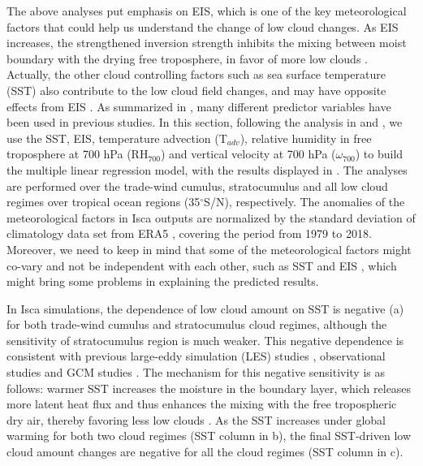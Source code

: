 The above analyses put emphasis on EIS, which is one of the key meteorological factors that could help us understand the change of low cloud changes. As EIS increases, the strengthened inversion strength inhibits the mixing between moist boundary with the drying free troposphere, in favor of more low clouds \citep[e.g.,][]{Qu2014,Qu2015strength,Ceppi2017,Webb2018interactions,Scott2020}. Actually, the other cloud controlling factors such as sea surface temperature (SST) also contribute to the low cloud field changes, and may have opposite effects from EIS \citep[e.g.,][]{Bretherton2015,Myers2016,Scott2020,Myers2021,Cesana2021}. As summarized in \cite{Klein2017low}, many different predictor variables have been used in previous studies. In this section, following the analysis in \cite{Myers2016} and \cite{Zelinka2020causes}, we use the SST, EIS, temperature advection (T$_{adv}$), relative humidity in free troposphere at 700 hPa (RH$_{700}$) and vertical velocity at 700 hPa ($\omega_{700}$) to build the multiple linear regression model, with the results displayed in . The analyses are performed over the trade-wind cumulus, stratocumulus and all low cloud regimes over tropical ocean regions (35$^\circ$S/N), respectively. The anomalies of the meteorological factors in Isca outputs are normalized by the standard deviation of climatology data set from ERA5 \citep{era5}, covering the period from 1979 to 2018. Moreover, we need to keep in mind that some of the meteorological factors might co-vary and not be independent with each other, such as SST and EIS \citep{McCoy2017change}, which might bring some problems in explaining the predicted results.

In Isca simulations, the dependence of low cloud amount on SST is negative (a) for both trade-wind cumulus and stratocumulus cloud regimes, although the sensitivity of stratocumulus region is much weaker. This negative dependence is consistent with previous large-eddy simulation (LES) studies \citep[e.g.,][]{Bretherton2015}, observational studies \citep[e.g.,][]{Qu2015positive,Seethala2015,Scott2020,Myers2021} and GCM studies \citep[e.g.,][]{Myers2016}. The mechanism for this negative sensitivity is as follows: warmer SST increases the moisture in the boundary layer, which releases more latent heat flux and thus enhances the mixing with the free tropospheric dry air, thereby favoring less low clouds \citep{Qu2015positive,Scott2020}. As the SST increases under global warming for both two cloud regimes (SST column in b), the final SST-driven low cloud amount changes are negative for all the cloud regimes (SST column in c).

